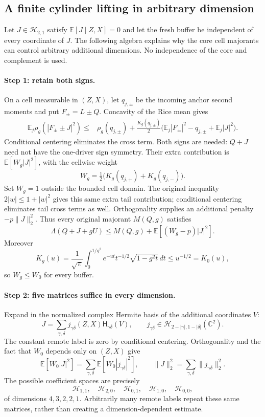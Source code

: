 \subsection{A finite cylinder lifting in arbitrary dimension}
\label{sec:uniform-complement}
Let $J\in\mathcal H_{2,1}$ satisfy $\mathbb E[J\mid Z,X]=0$ and let the fresh buffer be independent of every coordinate of $J$. The following algebra explains why the core cell majorants can control arbitrary additional dimensions. No independence of the core and complement is used.
\paragraph{Step 1: retain both signs.}
On a cell measurable in $(Z,X)$, let $q_{j,\pm}$ be the incoming
anchor second moments and put $F_\pm=L\pm Q$. Concavity of the Rice
mean gives
\[
\begin{split}
 \mathbb E_j\rho_g(|F_\pm\pm J|^2)
 \le{}&\rho_g(q_{j,\pm})+\frac{K_g(q_{j,\pm})}{2}
 \bigl(\mathbb E_j|F_\pm|^2-q_{j,\pm}+\mathbb E_j|J|^2\bigr).
\end{split}
\]
Conditional centering eliminates the cross term. Both signs are needed:
$Q+J$ need not have the one-driver sign symmetry. Their extra contribution
is $\mathbb E[W_g|J|^2]$, with the cellwise weight
\[
 W_g=\tfrac12\bigl(K_g(q_{j,+})+K_g(q_{j,-})\bigr).
\]
Set $W_g=1$ outside the bounded cell domain. The original inequality
$2|w|\le1+|w|^2$ gives this same extra tail contribution; conditional
centering eliminates tail cross terms as well. Orthogonality supplies
an additional penalty $-p\|J\|_2^2$. Thus every original majorant
$M(Q,g)$ satisfies
\[
 \Lambda(Q+J+gU)\le M(Q,g)+\mathbb E[(W_g-p)|J|^2].
\]
Moreover
\[
 K_g(u)=\frac1{\sqrt\pi}\int_0^{1/g^2}
 e^{-ut}t^{-1/2}\sqrt{1-g^2t}\,dt\le u^{-1/2}=K_0(u),
\]
so $W_g\le W_0$ for every buffer.

\paragraph{Step 2: five matrices suffice in every dimension.}
Expand in the normalized complex Hermite basis of the additional
coordinates $V$:
\[
 J=\sum_{\gamma,\delta}j_{\gamma\delta}(Z,X)
 \mathsf H_{\gamma\delta}(V),\qquad
 j_{\gamma\delta}\in
 \mathcal H_{2-|\gamma|,1-|\delta|}(\mathbb C^2).
\]
The constant remote label is zero by conditional centering. Orthogonality
and the fact that $W_0$ depends only on $(Z,X)$ give
\[
 \mathbb E[W_0|J|^2]
 =\sum_{\gamma,\delta}\mathbb E[W_0|j_{\gamma\delta}|^2],
 \qquad
 \|J\|_2^2=\sum_{\gamma,\delta}\|j_{\gamma\delta}\|_2^2.
\]
The possible coefficient spaces are precisely
\[
 \mathcal H_{1,1},\quad\mathcal H_{2,0},\quad
 \mathcal H_{0,1},\quad\mathcal H_{1,0},\quad\mathcal H_{0,0},
\]
of dimensions $4,3,2,2,1$. Arbitrarily many remote labels repeat these
same matrices, rather than creating a dimension-dependent estimate.


